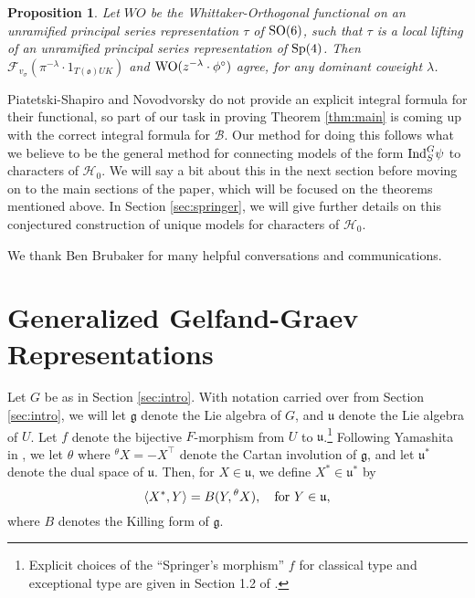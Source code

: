 \documentclass[11pt,letterpaper]{article}
\newcommand{\calH}{\mathcal{H}} %
\newcommand{\calB}{\mathcal{B}}
\newcommand{\calF}{\mathcal{F}}
\newcommand{\goth}{\mathfrak}
\newcommand{\SO}{\textup{SO}}
\newcommand{\Sp}{\textup{Sp}}
\newcommand{\WO}{\textup{WO}}
\newcommand{\Ind}{\textup{Ind}}
\newtheorem{Proposition}[Theorem]{Proposition}
\theoremstyle{remark}
\numberwithin{equation}{section}
\begin{document}
\begin{Proposition}\label{prop:shalika}
Let $WO$ be the Whittaker-Orthogonal functional on an unramified principal series representation $\tau$ of $\SO(6)$, such that $\tau$ is a local lifting of an unramified principal series representation of $\Sp(4)$. Then $\calF_{v_{\sigma}}(\pi^{-\lambda}\cdot 1_{T(\goth{o})UK})$ and $\WO(z^{-\lambda}\cdot \phi^{\circ})$ agree, for any dominant coweight $\lambda$.
\end{Proposition}

Piatetski-Shapiro and Novodvorsky do not provide an explicit integral formula for their functional, so part of our task in proving Theorem \ref{thm:main} is coming up with the correct integral formula for $\calB$. Our method for doing this follows what we believe to be the general method for connecting models of the form $\Ind_S^G \psi$ to characters of $\calH_0$. We will say a bit about this 
in the next section before moving on to the main sections of the paper, which will be focused on the theorems mentioned above. In Section \ref{sec:springer}, we will give further details on this conjectured construction of unique models for characters of $\calH_0$.

We thank Ben Brubaker for many helpful conversations and communications.

\section{Generalized Gelfand-Graev Representations} \label{sec:gggr}


Let $G$ be as in Section \ref{sec:intro}. With notation carried over from Section \ref{sec:intro}, we will let $\goth{g}$ denote the Lie algebra of $G$, and $\goth{u}$ denote the Lie algebra of $U$. Let $f$ denote the bijective $F$-morphism from $U$ to $\goth{u}$.\footnote{Explicit choices of the ``Springer's morphism'' $f$ for classical type and exceptional type are given in Section 1.2 of \cite{Kaw2}.} Following Yamashita in \cite{Yam}, we let $\theta$ where $^{\theta}X = -X^{\top}$ denote the Cartan involution of $\goth{g}$, and let $\goth{u}^{\ast}$ denote the dual space of $\goth{u}$. Then, for $X \in \goth{u}$, we define $X^{\ast} \in \goth{u}^{\ast}$ by \begin{equation} \langle X^{\ast}, Y \rangle = B(Y, {^{\theta}X}), \quad \textup{for } Y \in \goth{u},\end{equation} where $B$ denotes the Killing form of $\goth{g}$.
\end{document}
